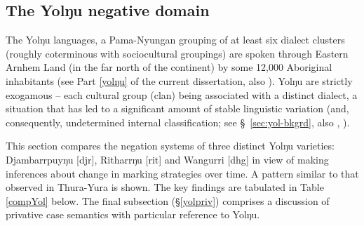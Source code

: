 {\subsection{The Yolŋu negative domain}\label{NEC-yolŋu}

The Yolŋu languages, a Pama-Nyungan grouping of at least six dialect clusters (roughly coterminous with sociocultural groupings) are spoken through Eastern Arnhem Land (in the far north of the continent) by some 12,000 Aboriginal inhabitants (see Part \ref{yolŋu} of the current dissertation, also \citealt[18\textit{ff}]{Wilkinson1991}). Yolŋu are strictly exogamous -- each cultural group (clan) being associated with a distinct dialect, a situation that has led to a significant amount of stable linguistic variation (and, consequently, undetermined internal classification; see \S~\ref{sec:yol-bkgrd}, also  \citealt{Schebeck2001}, \citealt[836]{Bowern2012b}).

This section compares the negation systems of three distinct Yolŋu varieties: Djambarrpuyŋu [\gls{djr}], Ritharrŋu [\gls{rit}] and Wangurri [\gls{dhg}] in view of making inferences about change in marking strategies over time. A pattern similar to that observed in Thura-Yura is shown. The key findings are tabulated in Table \ref{compYol} below. The final subsection (§\thinspace\ref{yolpriv}) comprises a discussion of privative case semantics with particular reference to Yolŋu.

}
